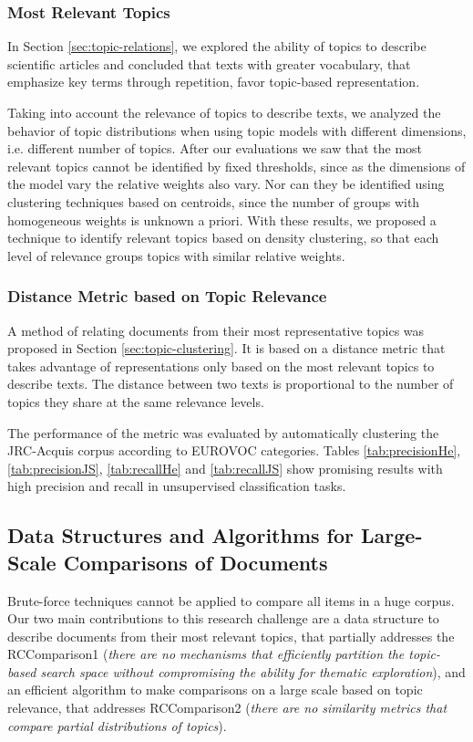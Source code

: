 \subsubsection{Most Relevant Topics}

In Section \ref{sec:topic-relations}, we explored the ability of topics to describe scientific articles and concluded that texts with greater vocabulary, that emphasize key terms through repetition, favor topic-based representation. 

Taking into account the relevance of topics to describe texts, we analyzed the behavior of topic distributions when using topic models with different dimensions, i.e. different number of topics. After our evaluations we saw that the most relevant topics cannot be identified by fixed thresholds, since as the dimensions of the model vary the relative weights also vary. Nor can they be identified using clustering techniques based on centroids, since the number of groups with homogeneous weights is unknown a priori. With these results, we proposed a technique to identify relevant topics based on density clustering, so that each level of relevance groups topics with similar relative weights.

\subsubsection{Distance Metric based on Topic Relevance}

A method of relating documents from their most representative topics was proposed in Section \ref{sec:topic-clustering}. It is based on a distance metric that takes advantage of representations only based on the most relevant topics to describe texts. The distance between two texts is proportional to the number of topics they share at the same relevance levels.

The performance of the metric was evaluated by automatically clustering the JRC-Acquis corpus according to EUROVOC categories. Tables \ref{tab:precisionHe}, \ref{tab:precisionJS}, \ref{tab:recallHe} and \ref{tab:recallJS} show promising results with high precision and recall in unsupervised classification tasks.


\subsection{Data Structures and Algorithms for Large-Scale Comparisons of Documents}

Brute-force techniques cannot be applied to compare all items in a huge corpus. Our two main contributions to this research challenge are a data structure to describe documents from their most relevant topics, that partially addresses the RCComparison1 (\textit{there are no mechanisms that efficiently partition the topic-based search space without compromising the ability for thematic exploration}), and an efficient algorithm to make comparisons on a large scale based on topic relevance, that addresses RCComparison2 (\textit{there are no similarity metrics that compare partial distributions of topics}).

